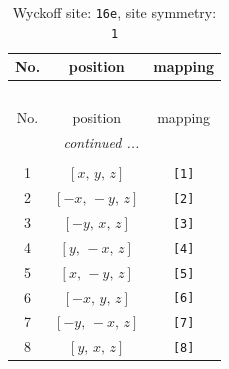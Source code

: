 \documentclass[fleqn,8pt]{jsarticle}
\begin{document}
\begin{longtable}{ccc}
\caption{Wyckoff site: {\tt 16e}, site symmetry: {\tt 1}}
 \\
 \hline \hline
No. & position & mapping \\ \hline \endfirsthead

\multicolumn{2}{l}{\tablename\ \thetable{}} \\
 \hline \hline
No. & position & mapping \\ \hline \endhead

 \hline \hline
\multicolumn{2}{r}{\footnotesize\it continued ...} \\ \endfoot

 \hline \hline
\multicolumn{2}{r}{} \\ \endlastfoot

1 & $\left[ x,\, y,\, z \right]$ & {\tt [1]} \\ \hline
2 & $\left[ - x,\, - y,\, z \right]$ & {\tt [2]} \\ \hline
3 & $\left[ - y,\, x,\, z \right]$ & {\tt [3]} \\ \hline
4 & $\left[ y,\, - x,\, z \right]$ & {\tt [4]} \\ \hline
5 & $\left[ x,\, - y,\, z \right]$ & {\tt [5]} \\ \hline
6 & $\left[ - x,\, y,\, z \right]$ & {\tt [6]} \\ \hline
7 & $\left[ - y,\, - x,\, z \right]$ & {\tt [7]} \\ \hline
8 & $\left[ y,\, x,\, z \right]$ & {\tt [8]} \\
\end{longtable}
\end{document}
